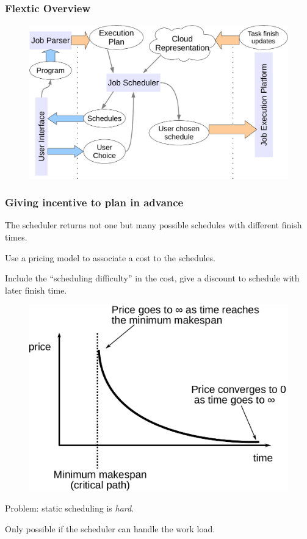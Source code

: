 \documentclass{beamer}
\newcommand{\flex}{\textsf{Flextic}\xspace}
\begin{document}
\begin{frame}
  \frametitle{\flex Overview}
  \begin{figure}
    \includegraphics[scale=0.4]{overview}
  \end{figure}
\end{frame}

\begin{frame}
  \frametitle{Giving incentive to plan in advance}

  The scheduler returns not one but many possible schedules with different finish times.

  Use a pricing model to associate a cost to the schedules.

  Include the ``scheduling difficulty'' in the cost, give a discount to schedule with later finish time.

  \begin{figure}
    \includegraphics[scale=0.3]{price_curve}
  \end{figure}

  Problem: static scheduling is \emph{hard}.

  Only possible if the scheduler can handle the work load.

\end{frame}
\end{document}
